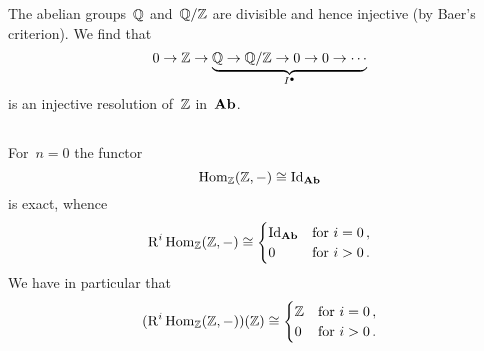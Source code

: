 \section{}





\subsection{}

The abelian groups~$\mathbb{Q}$ and~$\mathbb{Q}/\mathbb{Z}$ are divisible and hence injective (by Baer’s criterion).
We find that
\[
  0
  \to
  \mathbb{Z}
  \to
  \underbrace{
  \mathbb{Q}
  \to
  \mathbb{Q}/\mathbb{Z}
  \to
  0
  \to
  0
  \to
  \dotsb
  }_{I^\bullet}
\]
is an injective resolution of~$\mathbb{Z}$ in~$\mathbf{Ab}$.





\subsection{}

For~$n = 0$ the functor
\[
  \operatorname{Hom}_{\mathbb{Z}}(\mathbb{Z}, -)
  \cong
  \mathrm{Id}_{\mathbf{Ab}}
\]
is exact, whence
\[
  \operatorname{R}^i \operatorname{Hom}_{\mathbb{Z}}(\mathbb{Z}, -)
  \cong
  \begin{cases}
    \mathrm{Id}_{\mathbf{Ab}} & \text{for~$i = 0$}  \,, \\
    0         & \text{for~$i > 0$}  \,.
  \end{cases}
\]
We have in particular that
\[
  ( \operatorname{R}^i \operatorname{Hom}_{\mathbb{Z}}(\mathbb{Z}, -) )(\mathbb{Z})
  \cong
  \begin{cases}
    \mathbb{Z}  & \text{for~$i = 0$}  \,, \\
    0         & \text{for~$i > 0$}  \,.
  \end{cases}
\]

